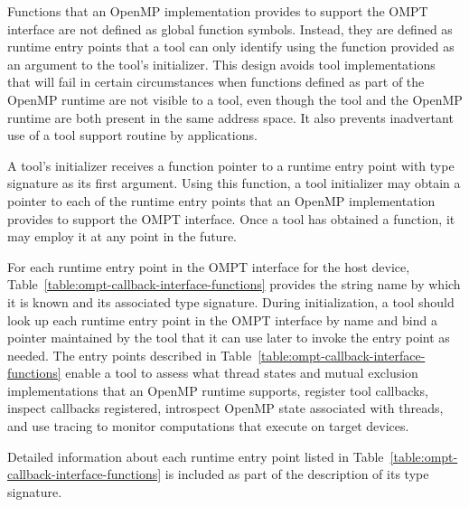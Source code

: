 Functions that an OpenMP implementation provides to support the OMPT interface
are not defined as global function symbols. Instead, they are defined as runtime entry points 
that a tool can only identify using the  function provided as an
argument to the tool's initializer. This design avoids tool
implementations that
will fail in certain circumstances when functions defined as part of
the OpenMP runtime are not visible to a tool, even though the tool and
the OpenMP runtime are both present in the same address space.
It also prevents inadvertant use of a tool support routine by
applications.
 
A tool's initializer receives a function pointer to a 
runtime entry point with type signature
 as its first argument. Using this
function, a tool initializer may obtain a pointer to each of the
runtime entry points that an OpenMP implementation provides to support
the OMPT interface. Once a tool has obtained a 
 function, it may employ it at any point in the future.

For each runtime entry point in the OMPT interface for the host device, 
Table~\ref{table:ompt-callback-interface-functions} provides the string
name by which it is known and its associated type signature.
During initialization, a tool should look up each runtime entry point in the
OMPT interface by name and bind a pointer maintained by the tool
that it can use later to invoke the entry point as needed. The entry points
described in Table~\ref{table:ompt-callback-interface-functions}
enable a tool to assess 
what thread states and mutual exclusion implementations that an OpenMP runtime supports,
register tool callbacks, inspect callbacks registered,
introspect OpenMP state associated with threads, and use tracing to monitor
computations that execute on target devices.

Detailed information about each runtime entry point listed in 
Table~\ref{table:ompt-callback-interface-functions} is included as
part of the description of its type signature.

